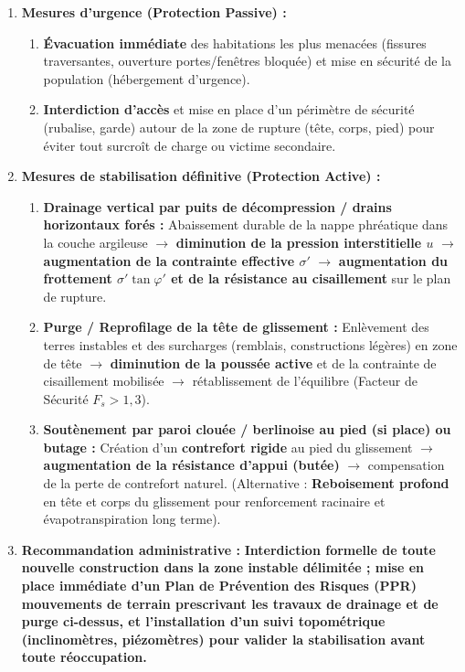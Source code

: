 \documentclass[11pt]{article}
\begin{document}
\begin{exercice}
\begin{enumerate}
\begin{enumerate}
      \end{enumerate}
\item \textbf{Mesures d'urgence (Protection Passive) :}
      \begin{enumerate}
      \item \textbf{Évacuation immédiate} des habitations les plus menacées (fissures traversantes, ouverture portes/fenêtres bloquée) et mise en sécurité de la population (hébergement d'urgence).
      \item \textbf{Interdiction d'accès} et mise en place d'un périmètre de sécurité (rubalise, garde) autour de la zone de rupture (tête, corps, pied) pour éviter tout surcroît de charge ou victime secondaire.
      \end{enumerate}
\item \textbf{Mesures de stabilisation définitive (Protection Active) :}
      \begin{enumerate}
      \item \textbf{Drainage vertical par puits de décompression / drains horizontaux forés :} Abaissement durable de la nappe phréatique dans la couche argileuse $\rightarrow$ \textbf{diminution de la pression interstitielle $u$} $\rightarrow$ \textbf{augmentation de la contrainte effective $\sigma'$} $\rightarrow$ \textbf{augmentation du frottement $\sigma'\tan\varphi'$ et de la résistance au cisaillement} sur le plan de rupture.
      \item \textbf{Purge / Reprofilage de la tête de glissement :} Enlèvement des terres instables et des surcharges (remblais, constructions légères) en zone de tête $\rightarrow$ \textbf{diminution de la poussée active} et de la contrainte de cisaillement mobilisée $\rightarrow$ rétablissement de l'équilibre (Facteur de Sécurité $F_s > 1,3$).
      \item \textbf{Soutènement par paroi clouée / berlinoise au pied (si place) ou butage :} Création d'un \textbf{contrefort rigide} au pied du glissement $\rightarrow$ \textbf{augmentation de la résistance d'appui (butée)} $\rightarrow$ compensation de la perte de contrefort naturel. (Alternative : \textbf{Reboisement profond} en tête et corps du glissement pour renforcement racinaire et évapotranspiration long terme).
      \end{enumerate}
\item \textbf{Recommandation administrative :}
      \og \textbf{Interdiction formelle de toute nouvelle construction dans la zone instable délimitée ; mise en place immédiate d'un Plan de Prévention des Risques (PPR) mouvements de terrain prescrivant les travaux de drainage et de purge ci-dessus, et l'installation d'un suivi topométrique (inclinomètres, piézomètres) pour valider la stabilisation avant toute réoccupation.} \fg
\end{enumerate}
\end{exercice}
\end{document}
